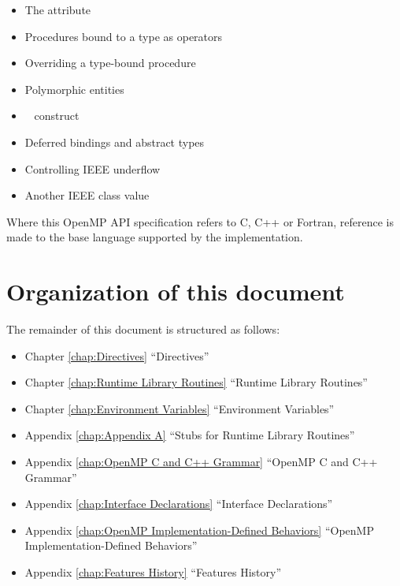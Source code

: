 \begin{itemize}
\begin{itemize}
\item The  attribute

\item Procedures bound to a type as operators

\item Overriding a type-bound procedure

\item Polymorphic entities

\item {}~ construct

\item Deferred bindings and abstract types

\item Controlling IEEE underflow

\item Another IEEE class value 
\end{itemize}
\end{itemize}

Where this OpenMP API specification refers to C, C++ or Fortran, reference is made to 
the base language supported by the implementation.








\pagebreak
\section{Organization of this document}
\label{sec:Organization of this document}
The remainder of this document is structured as follows: 

\begin{itemize}
\item Chapter \ref{chap:Directives} ``Directives''

\item Chapter \ref{chap:Runtime Library Routines} ``Runtime Library Routines''

\item Chapter \ref{chap:Environment Variables} ``Environment Variables''

\item Appendix \ref{chap:Appendix A} ``Stubs for Runtime Library Routines''

\item Appendix \ref{chap:OpenMP C and C++ Grammar} ``OpenMP C and C++ Grammar''

\item Appendix \ref{chap:Interface Declarations} ``Interface Declarations'' 

\item Appendix \ref{chap:OpenMP Implementation-Defined Behaviors} ``OpenMP Implementation-Defined Behaviors''

\item Appendix \ref{chap:Features History} ``Features History''
\end{itemize}

